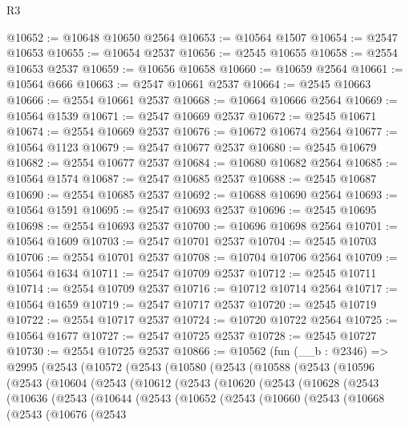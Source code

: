 \begin{lexlean}{R3}
\begin{coremodule}
@10652 := @10648 @10650 @2564
@10653 := @10564 @1507
@10654 := @2547 @10653
@10655 := @10654 @2537
@10656 := @2545 @10655
@10658 := @2554 @10653 @2537
@10659 := @10656 @10658
@10660 := @10659 @2564
@10661 := @10564 @666
@10663 := @2547 @10661 @2537
@10664 := @2545 @10663
@10666 := @2554 @10661 @2537
@10668 := @10664 @10666 @2564
@10669 := @10564 @1539
@10671 := @2547 @10669 @2537
@10672 := @2545 @10671
@10674 := @2554 @10669 @2537
@10676 := @10672 @10674 @2564
@10677 := @10564 @1123
@10679 := @2547 @10677 @2537
@10680 := @2545 @10679
@10682 := @2554 @10677 @2537
@10684 := @10680 @10682 @2564
@10685 := @10564 @1574
@10687 := @2547 @10685 @2537
@10688 := @2545 @10687
@10690 := @2554 @10685 @2537
@10692 := @10688 @10690 @2564
@10693 := @10564 @1591
@10695 := @2547 @10693 @2537
@10696 := @2545 @10695
@10698 := @2554 @10693 @2537
@10700 := @10696 @10698 @2564
@10701 := @10564 @1609
@10703 := @2547 @10701 @2537
@10704 := @2545 @10703
@10706 := @2554 @10701 @2537
@10708 := @10704 @10706 @2564
@10709 := @10564 @1634
@10711 := @2547 @10709 @2537
@10712 := @2545 @10711
@10714 := @2554 @10709 @2537
@10716 := @10712 @10714 @2564
@10717 := @10564 @1659
@10719 := @2547 @10717 @2537
@10720 := @2545 @10719
@10722 := @2554 @10717 @2537
@10724 := @10720 @10722 @2564
@10725 := @10564 @1677
@10727 := @2547 @10725 @2537
@10728 := @2545 @10727
@10730 := @2554 @10725 @2537
@10866 := @10562
    (fun (__b : @2346) =>
    @2995
      (@2543
        (@10572
          (@2543
            (@10580
              (@2543
                (@10588
                  (@2543
                    (@10596
                      (@2543
                        (@10604
                          (@2543
                            (@10612
                              (@2543
                                (@10620
                                  (@2543
                                    (@10628
                                      (@2543
                                        (@10636
                                          (@2543
                                            (@10644
                                              (@2543
                                                (@10652
                                                  (@2543
                                                    (@10660
                                                      (@2543
                                                        (@10668
                                                          (@2543
                                                            (@10676
                                                              (@2543

\end{coremodule}
\end{lexlean}
